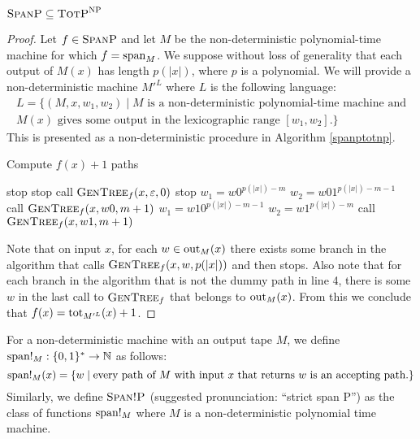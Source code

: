 \begin{theo}
	$\spanp \subseteq \totp^{\np}$
\end{theo}
\begin{proof}
	Let $f\in\spanp$ and let $M$ be the non-deterministic polynomial-time machine for which $f = \sp_M$. We suppose without loss of generality that each output of $M(x)$ has length $p(\vert x \vert)$, where $p$ is a polynomial. We will provide a non-deterministic machine $M'^L$ where $L$ is the following language:
	\begin{multline*}
	L = \{(M,x,w_1,w_2) \mid \text{$M$ is a non-deterministic polynomial-time machine and} \\ \text{$M(x)$ gives some output in the lexicographic range $[w_1,w_2]$.} \}
	\end{multline*}
	This is presented as a non-deterministic procedure in Algorithm \ref{spanptotnp}.
	
		\begin{algorithm}	
			\caption{Compute $f(x)+1$ paths} \label{spanptotnp}
			\begin{algorithmic}[]
				\Begin
				 stop
				\Else {}
				\State stop
				\State call $\textsc{GenTree}_{f}(x,\varepsilon,0)$
				\EndIf
				\EndBegin
				\State stop
				\Else
				\State $w_1 = w0^{p(\vert x \vert)-m}$
				\State $w_2 = w01^{p(\vert x \vert)-m-1}$
				\State call $\textsc{GenTree}_{f}(x,w0,m+1)$
				\EndIf
				\State $w_1 = w10^{p(\vert x \vert)-m-1}$
				\State $w_2 = w1^{p(\vert x \vert)-m}$
				\State call $\textsc{GenTree}_{f}(x,w1,m+1)$
				\EndIf
				\EndIf
				\EndProcedure
			\end{algorithmic}
		\end{algorithm}
		
		Note that on input $x$, for each $w \in \out_M(x)$ there exists some branch in the algorithm that calls $\textsc{GenTree}_{f}(x,w,p(\vert x \vert))$ and then stops. Also note that for each branch in the algorithm that is not the dummy path in line 4, there is some $w$ in the last call to $\textsc{GenTree}_{f}$ that belongs to $\out_M(x)$. From this we conclude that $f(x) = \tot_{M'^L}(x)+1$.
\end{proof}

For a non-deterministic machine with an output tape $M$, we define $\sp!_M:\{0,1\}^*\to\N$ as follows:
\[
	\sp!_M(x) = \{w \mid \text{every path of $M$ with input $x$ that returns $w$ is an accepting path.} \}
\]
Similarly, we define $\stspanp$ (suggested pronunciation: ``strict span P'') as the class of functions $\sp!_M$ where $M$ is a non-deterministic polynomial time machine.

